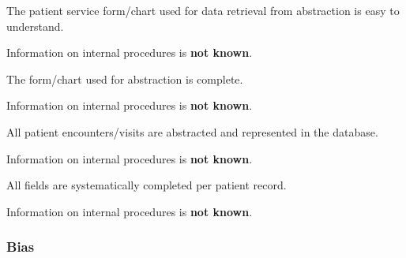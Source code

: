 \begin{QandA}
    \item The patient service form/chart used for data retrieval from abstraction is easy to understand.
    \begin{answered}
        Information on internal procedures is \textbf{not known}.
    \end{answered}

    \item The form/chart used for abstraction is complete.
    \begin{answered}
        Information on internal procedures is \textbf{not known}.
    \end{answered}

    \item All patient encounters/visits are abstracted and represented in the database.
    \begin{answered}
        Information on internal procedures is \textbf{not known}.
    \end{answered}

    \item All fields are systematically completed per patient record.
    \begin{answered}
        Information on internal procedures is \textbf{not known}.
    \end{answered}

\end{QandA}

\subsubsection{Bias}

